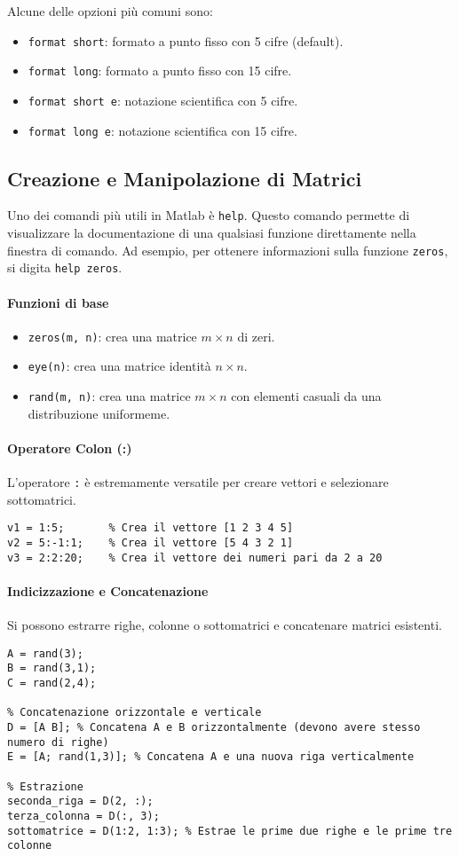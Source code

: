 Alcune delle opzioni più comuni sono:
\begin{itemize}
    \item \texttt{format short}: formato a punto fisso con 5 cifre (default).
    \item \texttt{format long}: formato a punto fisso con 15 cifre.
    \item \texttt{format short e}: notazione scientifica con 5 cifre.
    \item \texttt{format long e}: notazione scientifica con 15 cifre.
\end{itemize}

\subsection{Creazione e Manipolazione di Matrici}
Uno dei comandi più utili in Matlab è \lstinline|help|. Questo comando permette di visualizzare la documentazione di una qualsiasi funzione direttamente nella finestra di comando. Ad esempio, per ottenere informazioni sulla funzione \lstinline|zeros|, si digita \lstinline|help zeros|.
\paragraph{Funzioni di base}
\begin{itemize}
    \item \texttt{zeros(m, n)}: crea una matrice $m \times n$ di zeri.
    \item \texttt{eye(n)}: crea una matrice identità $n \times n$.
    \item \texttt{rand(m, n)}: crea una matrice $m \times n$ con elementi casuali da una distribuzione uniformeme.
\end{itemize}

\paragraph{Operatore Colon (:)}
L'operatore \texttt{:} è estremamente versatile per creare vettori e selezionare sottomatrici.
\begin{lstlisting}
v1 = 1:5;       % Crea il vettore [1 2 3 4 5]
v2 = 5:-1:1;    % Crea il vettore [5 4 3 2 1]
v3 = 2:2:20;    % Crea il vettore dei numeri pari da 2 a 20
\end{lstlisting}

\paragraph{Indicizzazione e Concatenazione}
Si possono estrarre righe, colonne o sottomatrici e concatenare matrici esistenti.
\begin{lstlisting}
A = rand(3);
B = rand(3,1);
C = rand(2,4);

% Concatenazione orizzontale e verticale
D = [A B]; % Concatena A e B orizzontalmente (devono avere stesso numero di righe)
E = [A; rand(1,3)]; % Concatena A e una nuova riga verticalmente

% Estrazione
seconda_riga = D(2, :);
terza_colonna = D(:, 3);
sottomatrice = D(1:2, 1:3); % Estrae le prime due righe e le prime tre colonne
\end{lstlisting}

